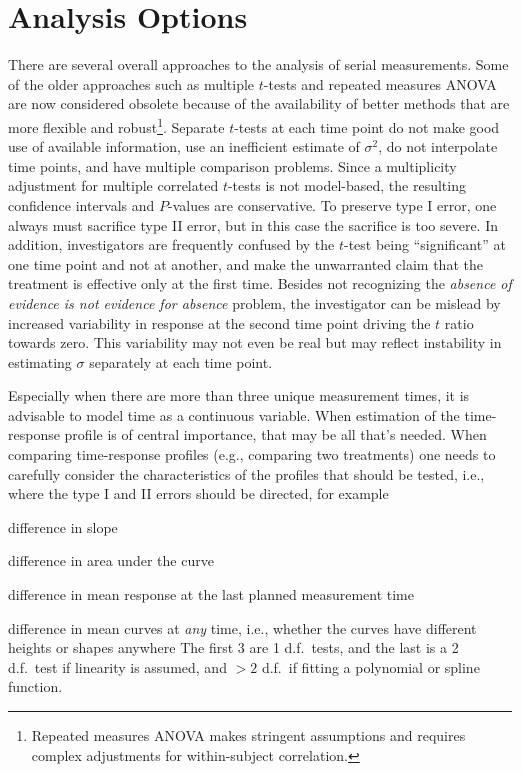 \section{Analysis Options}\ipacue
There are several overall approaches to the analysis of serial
measurements.  Some of the older approaches such as multiple $t$-tests
and repeated measures ANOVA are
now considered obsolete because of the availability of better methods that are
more flexible and robust\footnote{Repeated measures ANOVA makes stringent assumptions and requires complex adjustments for within-subject correlation.}.
Separate $t$-tests at each time point do not make good use of
available information, use an inefficient estimate of $\sigma^2$, do
not interpolate time points, and have multiple comparison problems.
Since a multiplicity adjustment for multiple correlated $t$-tests is
not model-based, the resulting confidence intervals and $P$-values
are conservative.  To preserve type I error, one always must sacrifice
type II error, but in this case the sacrifice is too severe.
In addition, investigators are frequently confused by the $t$-test being
``significant'' at one time point and not at another, and make the
unwarranted claim that the treatment is effective only at the first
time.  Besides not recognizing the \emph{absence of evidence is not evidence for absence} problem, the investigator can be mislead by
increased variability in response at the second time point driving
the $t$ ratio towards zero.  This variability may not even be real but
may reflect instability in estimating $\sigma$ separately at each time
point.

Especially when there are more than three unique measurement times, it is advisable to model time as a continuous variable.  When estimation of the time-response profile is of central importance, that may be all that's needed.  When comparing time-response profiles (e.g., comparing two treatments) one needs to carefully consider the characteristics of the profiles that should be tested, i.e., where the type I and II errors should be directed, for example
\bi
\item difference in slope
\item difference in area under the curve
\item difference in mean response at the last planned measurement time
\item difference in mean curves at \emph{any} time, i.e., whether the curves have different heights or shapes anywhere
\ei
The first 3 are 1 d.f.\ tests, and the last is a 2 d.f.\ test if linearity is assumed, and $> 2$ d.f.\ if fitting a polynomial or spline function.

